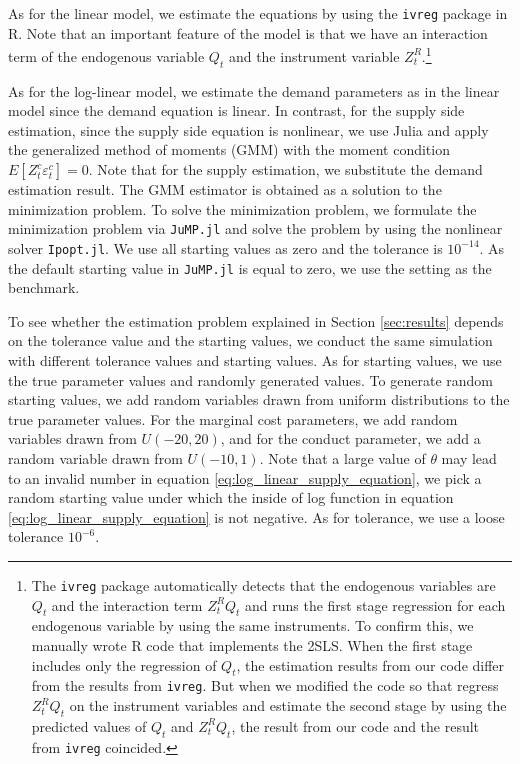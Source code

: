\documentclass[11pt, a4paper]{article}
\begin{document}
As for the linear model, we estimate the equations by using the \texttt{ivreg} package in R.
Note that an important feature of the model is that we have an interaction term of the endogenous variable $Q_t$ and the instrument variable $Z^{R}_{t}$.\footnote{The \texttt{ivreg} package automatically detects that the endogenous variables are $Q_t$ and the interaction term $Z^{R}_{t}Q_t$ and runs the first stage regression for each endogenous variable by using the same instruments. To confirm this, we manually wrote R code that implements the 2SLS. 
When the first stage includes only the regression of $Q_t$, the estimation results from our code differ from the results from \texttt{ivreg}. 
But when we modified the code so that regress $Z^{R}_{t}Q_t$ on the instrument variables and estimate the second stage by using the predicted values of $Q_t$ and $Z^{R}_{t}Q_t$, the result from our code and the result from \texttt{ivreg} coincided.}


As for the log-linear model, we estimate the demand parameters as in the linear model since the demand equation is linear.
In contrast, for the supply side estimation, since the supply side equation is nonlinear, we use Julia and apply the generalized method of moments (GMM) with the moment condition $E[Z^{c}_{t} \varepsilon^{c}_{t}] = 0$.
Note that for the supply estimation, we substitute the demand estimation result.
The GMM estimator is obtained as a solution to the minimization problem.
To solve the minimization problem, we formulate the minimization problem via \texttt{JuMP.jl} and solve the problem by using the nonlinear solver \texttt{Ipopt.jl}. We use all starting values as zero and the tolerance is $10^{-14}$.
As the default starting value in \texttt{JuMP.jl} is equal to zero, we use the setting as the benchmark.

To see whether the estimation problem explained in Section \ref{sec:results} depends on the tolerance value and the starting values, we conduct the same simulation with different tolerance values and starting values.
As for starting values, we use the true parameter values and randomly generated values.
To generate random starting values, we add random variables drawn from uniform distributions to the true parameter values. 
For the marginal cost parameters, we add random variables drawn from $U(-20, 20)$, and for the conduct parameter, we add a random variable drawn from $U(-10, 1)$. 
Note that a large value of $\theta$ may lead to an invalid number in equation \eqref{eq:log_linear_supply_equation}, we pick a random starting value under which the inside of log function in equation \eqref{eq:log_linear_supply_equation} is not negative.
As for tolerance, we use a loose tolerance $10^{-6}$.
\end{document}
